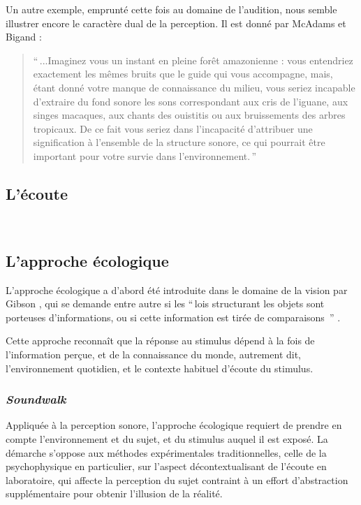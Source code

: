 Un autre exemple, emprunté cette fois au domaine de l'audition, nous semble illustrer encore le caractère dual de la perception. Il est donné par McAdams et Bigand \citep[p. 2]{mcadams1994penser}:

\begin{quote}
``\,...Imaginez vous un instant en pleine forêt amazonienne : vous entendriez exactement les mêmes bruits que le guide qui vous accompagne, mais, étant donné votre manque de connaissance du milieu, vous seriez incapable d'extraire du fond sonore les sons correspondant aux cris de l'iguane, aux singes macaques, aux chants des ouistitis ou aux bruissements des arbres tropicaux. De ce fait vous seriez dans l'incapacité d'attribuer une signification à l'ensemble de la structure sonore, ce qui pourrait être important pour votre survie dans l'environnement.\,''
\end{quote}

\subsection{L'écoute}
\label{sec:ch3_ecoute}

\\


\subsection{L'approche écologique}
\label{sec:ch3_ecologique}

L'approche écologique a d'abord été introduite dans le domaine de la vision par Gibson \citep{gibson1966senses}, qui se demande entre autre si les ``\,lois structurant les objets sont porteuses d'informations, ou si cette information est tirée de comparaisons \,'' \citep{gibson1978ecological}.

Cette approche reconnaît que la réponse au stimulus dépend à la fois de l'information perçue, et de la connaissance du monde, autrement dit, l'environnement quotidien, et le contexte habituel d'écoute du stimulus.

\subsubsection{\emph{Soundwalk}}

Appliquée à la perception sonore, l'approche écologique requiert de prendre en compte l'environnement et du sujet, et du stimulus auquel il est exposé. La démarche s'oppose aux méthodes expérimentales traditionnelles, celle de la psychophysique en particulier, sur l'aspect décontextualisant de l'écoute en laboratoire, qui affecte la perception du sujet contraint à un effort d'abstraction supplémentaire pour obtenir l'illusion de la réalité.

